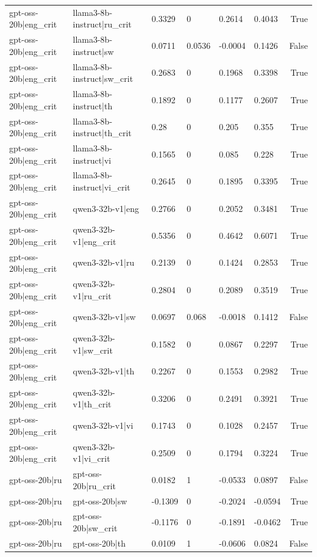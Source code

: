 \begin{table}
\begin{tabular}{llllllr}
gpt-oss-20b|eng_crit & llama3-8b-instruct|ru_crit & 0.3329 & 0 & 0.2614 & 0.4043 & True \\
gpt-oss-20b|eng_crit & llama3-8b-instruct|sw & 0.0711 & 0.0536 & -0.0004 & 0.1426 & False \\
gpt-oss-20b|eng_crit & llama3-8b-instruct|sw_crit & 0.2683 & 0 & 0.1968 & 0.3398 & True \\
gpt-oss-20b|eng_crit & llama3-8b-instruct|th & 0.1892 & 0 & 0.1177 & 0.2607 & True \\
gpt-oss-20b|eng_crit & llama3-8b-instruct|th_crit & 0.28 & 0 & 0.205 & 0.355 & True \\
gpt-oss-20b|eng_crit & llama3-8b-instruct|vi & 0.1565 & 0 & 0.085 & 0.228 & True \\
gpt-oss-20b|eng_crit & llama3-8b-instruct|vi_crit & 0.2645 & 0 & 0.1895 & 0.3395 & True \\
gpt-oss-20b|eng_crit & qwen3-32b-v1|eng & 0.2766 & 0 & 0.2052 & 0.3481 & True \\
gpt-oss-20b|eng_crit & qwen3-32b-v1|eng_crit & 0.5356 & 0 & 0.4642 & 0.6071 & True \\
gpt-oss-20b|eng_crit & qwen3-32b-v1|ru & 0.2139 & 0 & 0.1424 & 0.2853 & True \\
gpt-oss-20b|eng_crit & qwen3-32b-v1|ru_crit & 0.2804 & 0 & 0.2089 & 0.3519 & True \\
gpt-oss-20b|eng_crit & qwen3-32b-v1|sw & 0.0697 & 0.068 & -0.0018 & 0.1412 & False \\
gpt-oss-20b|eng_crit & qwen3-32b-v1|sw_crit & 0.1582 & 0 & 0.0867 & 0.2297 & True \\
gpt-oss-20b|eng_crit & qwen3-32b-v1|th & 0.2267 & 0 & 0.1553 & 0.2982 & True \\
gpt-oss-20b|eng_crit & qwen3-32b-v1|th_crit & 0.3206 & 0 & 0.2491 & 0.3921 & True \\
gpt-oss-20b|eng_crit & qwen3-32b-v1|vi & 0.1743 & 0 & 0.1028 & 0.2457 & True \\
gpt-oss-20b|eng_crit & qwen3-32b-v1|vi_crit & 0.2509 & 0 & 0.1794 & 0.3224 & True \\
gpt-oss-20b|ru & gpt-oss-20b|ru_crit & 0.0182 & 1 & -0.0533 & 0.0897 & False \\
gpt-oss-20b|ru & gpt-oss-20b|sw & -0.1309 & 0 & -0.2024 & -0.0594 & True \\
gpt-oss-20b|ru & gpt-oss-20b|sw_crit & -0.1176 & 0 & -0.1891 & -0.0462 & True \\
gpt-oss-20b|ru & gpt-oss-20b|th & 0.0109 & 1 & -0.0606 & 0.0824 & False \\

\end{tabular}
\end{table}
